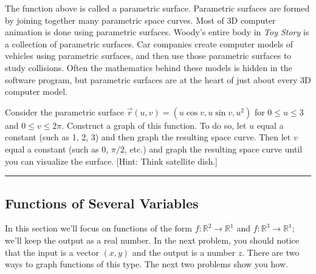 The function above is called a parametric surface.  Parametric surfaces are formed by joining together many parametric space curves. Most of 3D computer animation is done using parametric surfaces. Woody's entire body in {\it Toy Story} is a collection of parametric surfaces. Car companies create computer models of vehicles using parametric surfaces, and then use those parametric surfaces to study collisions. Often the mathematics behind these models is hidden in the software program, but parametric surfaces are at the heart of just about every 3D computer model.

\begin{problem}\label{second parametric surface example}%
%
 Consider the parametric surface $\vec r(u,v)=(u\cos v, u\sin v, u^2)$ for $0\leq u\leq 3$ and $0\leq v\leq 2 \pi$.
 Construct a graph of this function. To do so, let $u$ equal a constant (such as 1, 2, 3) and then graph the resulting space curve.  Then let $v$ equal a constant (such as 0, $\pi/2$, etc.) and graph the resulting space curve until you can visualize the surface. [Hint: Think satellite dish.] 
\hrule\end{problem}


\subsection{Functions of Several Variables}

In this section we'll focus on functions of the form $f:\mathbb{R}^2\to\mathbb{R}^1$ and $f:\mathbb{R}^3\to\mathbb{R}^1$; we'll keep the output as a real number. In the next problem, you should notice that the input is a vector $(x,y)$ and the output is a number $z$. There are two ways to graph functions of this type.  The next two problems show you how. 

